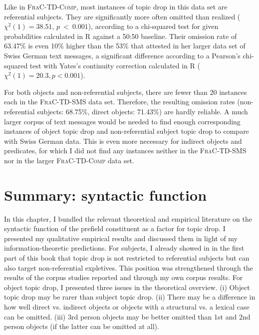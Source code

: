 \noindent
Like in \textsc{FraC-TD-Comp}, most instances of topic drop in this data set are referential subjects.
They are significantly more often omitted than realized ($\chi^2(1) = 38.51$, $p~<~0.001$), according to a chi-squared test for given probabilities calculated in R \citep{rcoreteam2021} against a 50:50 baseline.
Their omission rate of 63.47\% is even 10\% higher than the 53\% that \citet{frick2017} attested in her larger data set of Swiss German text messages, a significant difference according to a Pearson's chi-squared test with Yates's continuity correction calculated in R ($\chi^2(1) = 20.3, p < 0.001$).

For both objects and non-referential subjects, there are fewer than 20 instances each in the \textsc{FraC-TD-SMS} data set.
Therefore, the resulting omission rates (non-referential subjects: 68.75\%, direct objects: 71.43\%) are hardly reliable.
A much larger corpus of text messages would be needed to find enough corresponding instances of object topic drop and non-referential subject topic drop to compare with  Swiss German data.
This is even more necessary for indirect objects and predicates, for which I did not find any instances neither in the \textsc{FraC-TD-SMS} nor in the larger \textsc{FraC-TD-Comp} data set.

\section{Summary: syntactic function}\label{sec:usage.function.summary}
In this chapter, I bundled the relevant theoretical and empirical literature on the syntactic function of the prefield constituent as a factor for topic drop.
I presented my qualitative empirical results and discussed them in light of my information-theoretic predictions.
For subjects, I already showed in  in the first part of this book that topic drop is not restricted to referential subjects but can also target non-referential expletives. 
This position was strengthened through the results of the corpus studies reported and through my own corpus results.
For object topic drop, I presented three issues in the theoretical overview.
(i) Object topic drop may be rarer than subject topic drop.
(ii) There may be a difference in how well direct vs. indirect objects or objects with a structural vs. a lexical case  can be omitted.
(iii) 3rd person objects may be better omitted than 1st and 2nd person objects (if the latter can be omitted at all).

